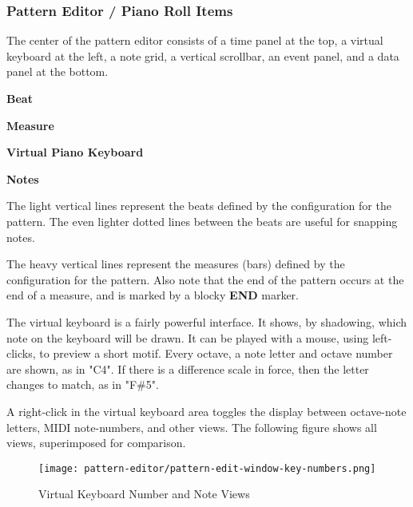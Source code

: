 \subsubsection{Pattern Editor / Piano Roll Items}
\label{subsubsec:pattern_editor_piano_roll_items}

   The center of the pattern editor consists of a time panel at the top,
   a virtual keyboard at the left, a note grid, a vertical scrollbar, an event
   panel, and a data panel at the bottom.

   \begin{enumber}
      \item \textbf{Beat}
      \item \textbf{Measure}
      \item \textbf{Virtual Piano Keyboard}
      \item \textbf{Notes}
   \end{enumber}

   \setcounter{ItemCounter}{0}      %

   The light vertical lines represent the beats defined by the configuration
   for the pattern.  The even lighter dotted lines between the beats are useful
   for snapping notes.

   The heavy vertical lines represent the measures (bars) defined by the
   configuration for the pattern.
   Also note that the end of the pattern
   occurs at the end of a measure, and is marked by a blocky \textbf{END}
   marker.

   The virtual keyboard is a fairly powerful interface.  It shows,
   by shadowing, which note on the keyboard will be drawn. It can be
   played with a mouse, using left-clicks, to preview a short motif.
   Every octave, a note letter and octave number are shown, as in
   "C4".  If there is a difference scale in force, then the letter changes to
   match, as in "F\#5".

   A right-click in the virtual keyboard area toggles the display
   between octave-note letters, MIDI note-numbers, and other views.
   The following figure shows all views, superimposed for comparison.

\begin{figure}[H]
   \centering 
   \texttt{[image: pattern-editor/pattern-edit-window-key-numbers.png]}
   \caption{Virtual Keyboard Number and Note Views}
   \label{fig:pattern_editor_key_numbers}
\end{figure}

